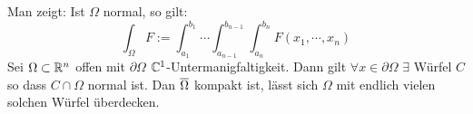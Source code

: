 \begin{Bem}
  Man zeigt: Ist $\Omega$ normal, so gilt:
  \[\int_\Omega F:=\int_{a_1}^{b_1}\cdots\int_{a_{n-1}}^{b_{n-1}}\int_{a_n}^{b_n}F(x_1,\cdots,x_n)\]
  Sei $\Omega\subset\mathbb{R}^n$ offen mit $\partial\Omega$ $\mathbb{C}^1$-Untermanigfaltigkeit. Dann gilt $\forall x\in\partial\Omega$ $\exists$ Würfel $C$ so dass $C\cap \Omega$ normal ist. Dan $\overline{\Omega}$ kompakt ist, lässt sich $\Omega$ mit endlich vielen solchen Würfel überdecken.
\end{Bem}
